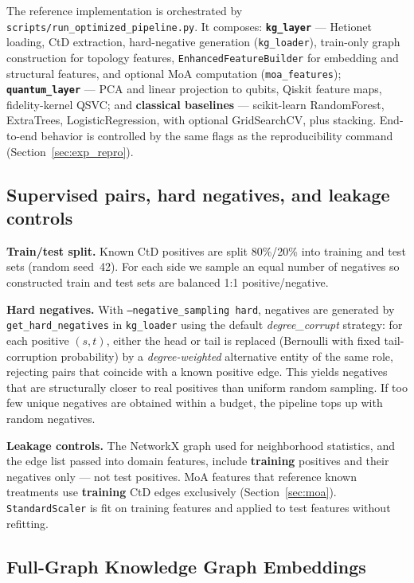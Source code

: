 \documentclass[twocolumn,10pt]{article}
\begin{document}
The reference implementation is orchestrated by \texttt{scripts/run\_optimized\_pipeline.py}. It composes: \textbf{\texttt{kg\_layer}} --- Hetionet loading, CtD extraction, hard-negative generation (\texttt{kg\_loader}), train-only graph construction for topology features, \texttt{EnhancedFeatureBuilder} for embedding and structural features, and optional MoA computation (\texttt{moa\_features}); \textbf{\texttt{quantum\_layer}} --- PCA and linear projection to qubits, Qiskit feature maps, fidelity-kernel QSVC; and \textbf{classical baselines} --- scikit-learn RandomForest, ExtraTrees, LogisticRegression, with optional GridSearchCV, plus stacking. End-to-end behavior is controlled by the same flags as the reproducibility command (Section~\ref{sec:exp_repro}).

\subsection{Supervised pairs, hard negatives, and leakage controls}

\textbf{Train/test split.} Known CtD positives are split 80\%/20\% into training and test sets (random seed~42). For each side we sample an equal number of negatives so constructed train and test sets are balanced 1:1 positive/negative.

\textbf{Hard negatives.} With \texttt{--negative\_sampling hard}, negatives are generated by \texttt{get\_hard\_negatives} in \texttt{kg\_loader} using the default \textit{degree\_corrupt} strategy: for each positive $(s,t)$, either the head or tail is replaced (Bernoulli with fixed tail-corruption probability) by a \emph{degree-weighted} alternative entity of the same role, rejecting pairs that coincide with a known positive edge. This yields negatives that are structurally closer to real positives than uniform random sampling. If too few unique negatives are obtained within a budget, the pipeline tops up with random negatives.

\textbf{Leakage controls.} The NetworkX graph used for neighborhood statistics, and the edge list passed into domain features, include \textbf{training} positives and their negatives only --- not test positives. MoA features that reference known treatments use \textbf{training} CtD edges exclusively (Section~\ref{sec:moa}). \texttt{StandardScaler} is fit on training features and applied to test features without refitting.

\subsection{Full-Graph Knowledge Graph Embeddings}
\end{document}
